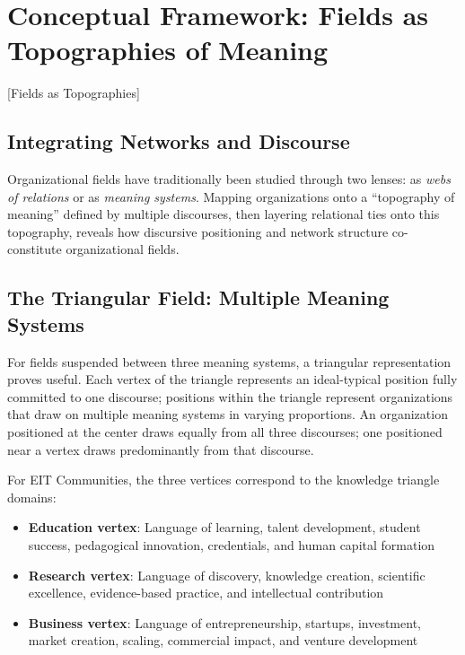 \documentclass[../main.tex]{subfiles}
\begin{document}
\section{Conceptual Framework: Fields as Topographies of Meaning}[Fields as Topographies]

\subsection{Integrating Networks and Discourse}

Organizational fields have traditionally been studied through two lenses: as \textit{webs of relations} or as \textit{meaning systems}. Mapping organizations onto a ``topography of meaning'' defined by multiple discourses, then layering relational ties onto this topography, reveals how discursive positioning and network structure co-constitute organizational fields.

\subsection{The Triangular Field: Multiple Meaning Systems}

For fields suspended between three meaning systems, a triangular representation proves useful. Each vertex of the triangle represents an ideal-typical position fully committed to one discourse; positions within the triangle represent organizations that draw on multiple meaning systems in varying proportions. An organization positioned at the center draws equally from all three discourses; one positioned near a vertex draws predominantly from that discourse.

For EIT Communities, the three vertices correspond to the knowledge triangle domains:

\begin{itemize}
    \item \textbf{Education vertex}: Language of learning, talent development, student success, pedagogical innovation, credentials, and human capital formation
    \item \textbf{Research vertex}: Language of discovery, knowledge creation, scientific excellence, evidence-based practice, and intellectual contribution
    \item \textbf{Business vertex}: Language of entrepreneurship, startups, investment, market creation, scaling, commercial impact, and venture development
\end{itemize}
\end{document}
